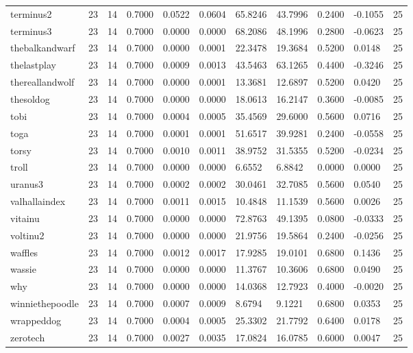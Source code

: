 \begin{table}[htbp]
\begin{tabular}{lllllllllll}
terminus2 & 23 & 14 & 0.7000 & 0.0522 & 0.0604 & 65.8246 & 43.7996 & 0.2400 & -0.1055 & 25 \\
terminus3 & 23 & 14 & 0.7000 & 0.0000 & 0.0000 & 68.2086 & 48.1996 & 0.2800 & -0.0623 & 25 \\
thebalkandwarf & 23 & 14 & 0.7000 & 0.0000 & 0.0001 & 22.3478 & 19.3684 & 0.5200 & 0.0148 & 25 \\
thelastplay & 23 & 14 & 0.7000 & 0.0009 & 0.0013 & 43.5463 & 63.1265 & 0.4400 & -0.3246 & 25 \\
thereallandwolf & 23 & 14 & 0.7000 & 0.0000 & 0.0001 & 13.3681 & 12.6897 & 0.5200 & 0.0420 & 25 \\
thesoldog & 23 & 14 & 0.7000 & 0.0000 & 0.0000 & 18.0613 & 16.2147 & 0.3600 & -0.0085 & 25 \\
tobi & 23 & 14 & 0.7000 & 0.0004 & 0.0005 & 35.4569 & 29.6000 & 0.5600 & 0.0716 & 25 \\
toga & 23 & 14 & 0.7000 & 0.0001 & 0.0001 & 51.6517 & 39.9281 & 0.2400 & -0.0558 & 25 \\
torsy & 23 & 14 & 0.7000 & 0.0010 & 0.0011 & 38.9752 & 31.5355 & 0.5200 & -0.0234 & 25 \\
troll & 23 & 14 & 0.7000 & 0.0000 & 0.0000 & 6.6552 & 6.8842 & 0.0000 & 0.0000 & 25 \\
uranus3 & 23 & 14 & 0.7000 & 0.0002 & 0.0002 & 30.0461 & 32.7085 & 0.5600 & 0.0540 & 25 \\
valhallaindex & 23 & 14 & 0.7000 & 0.0011 & 0.0015 & 10.4848 & 11.1539 & 0.5600 & 0.0026 & 25 \\
vitainu & 23 & 14 & 0.7000 & 0.0000 & 0.0000 & 72.8763 & 49.1395 & 0.0800 & -0.0333 & 25 \\
voltinu2 & 23 & 14 & 0.7000 & 0.0000 & 0.0000 & 21.9756 & 19.5864 & 0.2400 & -0.0256 & 25 \\
waffles & 23 & 14 & 0.7000 & 0.0012 & 0.0017 & 17.9285 & 19.0101 & 0.6800 & 0.1436 & 25 \\
wassie & 23 & 14 & 0.7000 & 0.0000 & 0.0000 & 11.3767 & 10.3606 & 0.6800 & 0.0490 & 25 \\
why & 23 & 14 & 0.7000 & 0.0000 & 0.0000 & 14.0368 & 12.7923 & 0.4000 & -0.0020 & 25 \\
winniethepoodle & 23 & 14 & 0.7000 & 0.0007 & 0.0009 & 8.6794 & 9.1221 & 0.6800 & 0.0353 & 25 \\
wrappeddog & 23 & 14 & 0.7000 & 0.0004 & 0.0005 & 25.3302 & 21.7792 & 0.6400 & 0.0178 & 25 \\
zerotech & 23 & 14 & 0.7000 & 0.0027 & 0.0035 & 17.0824 & 16.0785 & 0.6000 & 0.0047 & 25 \\

\end{tabular}
\end{table}
